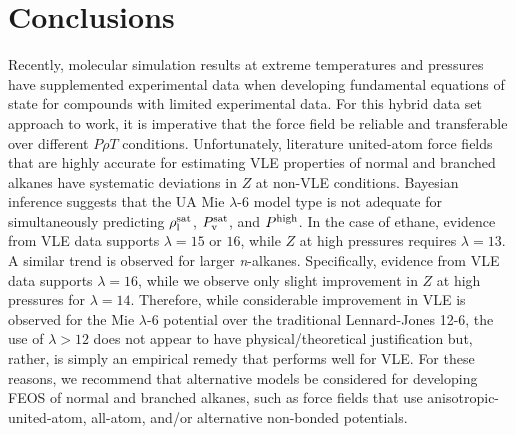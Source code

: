 \documentclass[preprint,letterpaper,floatfix,citeautoscript,aip,jcp]{revtex4-1}
\begin{document}
 
\section{Conclusions} \label{Conclusions}

Recently, molecular simulation results at extreme temperatures and pressures have supplemented experimental data when developing fundamental equations of state for compounds with limited experimental data. For this hybrid data set approach to work, it is imperative that the force field be reliable and transferable over different $P \rho T$ conditions. Unfortunately, literature united-atom force fields that are highly accurate for estimating VLE properties of normal and branched alkanes have systematic deviations in $Z$ at non-VLE conditions. Bayesian inference suggests that the UA Mie $\lambda$-6 model type is not adequate for simultaneously predicting $\rho_{\rm l}^{\rm sat}$, $P_{\rm v}^{\rm sat}$, and $P^{\rm high}$. In the case of ethane, evidence from VLE data supports $\lambda = 15$ or $16$, while $Z$ at high pressures requires $\lambda = 13$. A similar trend is observed for larger \textit{n}-alkanes. Specifically, evidence from VLE data supports $\lambda = 16$, while we observe only slight improvement in $Z$ at high pressures for $\lambda = 14$. Therefore, while considerable improvement in VLE is observed for the Mie $\lambda$-6 potential over the traditional Lennard-Jones 12-6, the use of $\lambda > 12$ does not appear to have physical/theoretical justification but, rather, is simply an empirical remedy that performs well for VLE. 
%
For these reasons, we recommend that alternative models be considered for developing FEOS of normal and branched alkanes, such as force fields that use anisotropic-united-atom, all-atom, and/or alternative non-bonded potentials.
\end{document}
